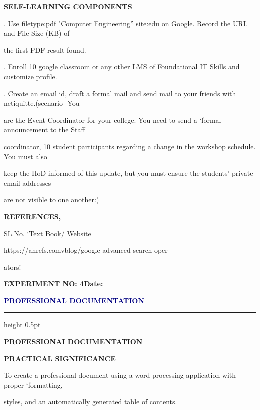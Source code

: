 \documentclass[10pt,a4paper]{article}
\newcommand{\expheading}[2]{%
  \vspace{0.1cm}\noindent\textbf{\large EXPERIMENT NO: #1}\hfill\textbf{Date: #2}\par
}
\newcommand{\exptitle}[1]{%
  \begin{center}\vspace{-2mm}\textcolor{navy}{\fontsize{20}{22}\selectfont\bfseries #1}\end{center}
  \vspace{1mm}\hrule height 0.5pt\vspace{3mm}
}
\begin{document}
\medskip\noindent\textbf{SELF-LEARNING COMPONENTS}\par
{}. Use filetype:pdf "Computer Engineering” site:edu on Google. Record the URL and File Size (KB) of\par
\noindent the first PDF result found.\par
{}. Enroll 10 google classroom or any other LMS of Foundational IT Skills and customize profile.\par
\clearpage
{}. Create an email id, draft a formal mail and send mail to your friends with netiquitte.(scenario- You\par
\noindent are the Event Coordinator for your college. You need to send a ‘formal announcement to the Staff\par
\noindent coordinator, 10 student participants regarding a change in the workshop schedule. You must also\par
\noindent keep the HoD informed of this update, but you must ensure the students’ private email addresses\par
\noindent are not visible to one another:)\par
\medskip\noindent\textbf{REFERENCES,}\par
\noindent SL.No. ‘Text Book/ Website\par

                                              https://ahrefs.comvblog/google-advanced-search-oper\par
\noindent ators!\par
\clearpage
\expheading{4}{\underline{\hspace{1.8cm}}}
\exptitle{PROFESSIONAL DOCUMENTATION}
\medskip\noindent\textbf{PROFESSIONAI DOCUMENTATION}\par

\medskip\noindent\textbf{PRACTICAL SIGNIFICANCE}\par
\noindent To create a professional document using a word processing application with proper ‘formatting,\par
\noindent styles, and an automatically generated table of contents.\par
\end{document}
